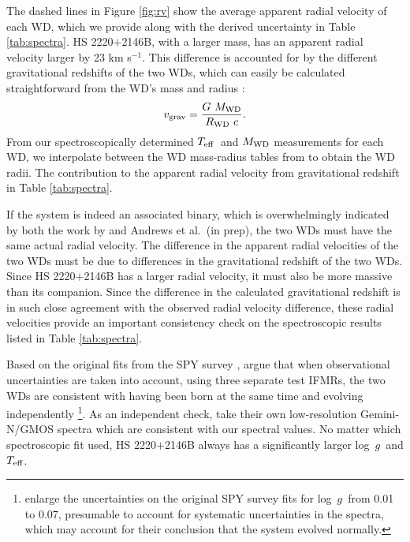 \documentclass{emulateapj}
\newcommand{\Teff}{\ifmmode {T_{\rm eff} }\else $T_{\rm eff}$\fi}
\newcommand{\logg}{\ifmmode {{\rm log}\ g }\else log~$g$\fi}
\begin{document}
The dashed lines in Figure \ref{fig:rv} show the average apparent radial velocity of each WD, which we provide along with the derived uncertainty in Table \ref{tab:spectra}. HS 2220$+$2146B, with a larger mass, has an apparent radial velocity larger by 23 km s$^{-1}$. This difference is accounted for by the different gravitational redshifts of the two WDs, which can easily be calculated straightforward from the WD's mass and radius \citep{falcon10}:
\begin{equation}
v_{\rm grav} = \frac{G~M_{\rm WD}}{R_{\rm WD}~c}. \label{eq:v_grav}
\end{equation}
From our spectroscopically determined \Teff\ and $M_{\rm WD}$ measurements for each WD, we interpolate between the WD mass-radius tables from \citet{wood95} to obtain the WD radii. The contribution to the apparent radial velocity from gravitational redshift in Table \ref{tab:spectra}. 

If the system is indeed an associated binary, which is overwhelmingly indicated by both the work by \citet{baxter14} and Andrews et al.\ (in prep), the two WDs must have the same actual radial velocity. The difference in the apparent radial velocities of the two WDs must be due to differences in the gravitational redshift of the two WDs. Since HS 2220$+$2146B has a larger radial velocity, it must also be more massive than its companion. Since the difference in the calculated gravitational redshift is in such close agreement with the observed radial velocity difference, these radial velocities provide an important consistency check on the spectroscopic results listed in Table \ref{tab:spectra}.

Based on the original fits from the SPY survey \citep{koester09},%
\citet{baxter14} argue that when observational uncertainties are taken into account, using three separate test IFMRs, the two WDs are consistent with having been born at the same time and evolving independently \footnote{\citet{baxter14} enlarge the uncertainties on the original SPY survey fits for \logg\ from 0.01 to 0.07, presumable to account for systematic uncertainties in the spectra, which may account for their conclusion that the system evolved normally.}. As an independent check, \citet{baxter14} take their own low-resolution Gemini-N/GMOS spectra which are consistent with our spectral values.%
No matter which spectroscopic fit used, HS 2220$+$2146B always has a significantly larger \logg\ and \Teff.
\end{document}
